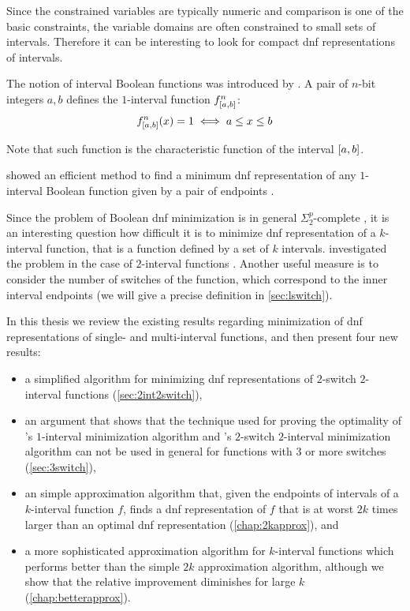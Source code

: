 Since the constrained variables are typically numeric
and comparison is one of the basic constraints,
the variable domains are often constrained
to small sets of intervals.
Therefore it can be interesting to look
for compact \acrshort{dnf}
representations of intervals.

The notion of
interval Boolean functions was introduced
by \citet{Schieber2005154}.
A pair of $n$-bit integers $a, b$
defines the $1$-interval function
$f^{n}_{[a, b]}$:
$$
f^{n}_{[a, b]} (x) = 1
\iff a \leq x \leq b
$$

Note that such function
is the characteristic function of the interval
$[a, b]$.

\citeauthor{Schieber2005154} showed an efficient method
to find a minimum \acrfull{dnf} representation
of any $1$-interval Boolean function
given by a pair of endpoints \citep{Schieber2005154}.

Since the problem of Boolean \acrshort{dnf} minimization is in general
$\Sigma_2^p$-complete \citep{Umans1998},
it is an interesting question how difficult it is
to minimize \acrshort{dnf} representation of
a $k$-interval function,
that is a function defined by a set of $k$ intervals.
\citeauthor{Dubovsky2012} investigated the problem
in the case of $2$-interval functions
\citep{Dubovsky2012}.
Another useful measure
is to consider the number of switches of the function,
which correspond to the inner interval endpoints
(we will give a precise definition
in \cref{sec:lswitch}).

In this thesis we review the existing results regarding
minimization of \acrshort{dnf} representations of
single- and multi-interval functions,
and then present four new results:

\begin{itemize}
\item a simplified algorithm
for minimizing \acrshort{dnf} representations
of $2$-switch
$2$-interval functions (\cref{sec:2int2switch}),

\item
an argument that shows
that the technique used for proving the optimality
of \citeauthor{Schieber2005154}'s
$1$-interval minimization algorithm
\citep{Schieber2005154}
and \citeauthor{Dubovsky2012}'s
$2$-switch $2$-interval minimization algorithm
\citep{Dubovsky2012}
can not be used in general for
functions with $3$ or more switches
(\cref{sec:3switch}),

\item
an simple approximation algorithm that,
given the endpoints of intervals
of a $k$-interval function $f$,
finds a \acrshort{dnf} representation of $f$
that is at worst
$2k$ times larger
than an optimal \acrshort{dnf} representation
(\cref{chap:2kapprox}), and

\item
a more sophisticated approximation algorithm
for $k$-interval functions
which performs better than the simple $2k$ approximation algorithm,
although we show that the relative improvement
diminishes for large $k$
(\cref{chap:betterapprox}).
\end{itemize}
